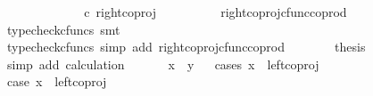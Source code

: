 \begin{isabellebody}
\ \ \ \ \isamarkupfalse%
\ \isamarkupfalse%
\ {\isachardoublequoteopen}{\isachardot}{\kern0pt}{\isachardot}{\kern0pt}{\isachardot}{\kern0pt}\ {\isacharequal}{\kern0pt}\ {\isasymlangle}{\isasymf}{\isacharcomma}{\kern0pt}\ {\isasymf}{\isasymrangle}\ {\isasymamalg}\ {\isasymlangle}{\isasymf}{\isacharcomma}{\kern0pt}{\isasymt}{\isasymrangle}\ {\isasymcirc}\isactrlsub c\ right{\isacharunderscore}{\kern0pt}coproj\ {\isasymone}\ {\isasymone}{\isachardoublequoteclose}\isanewline
\ \ \ \ \ \ \isamarkupfalse%
\ right{\isacharunderscore}{\kern0pt}coproj{\isacharunderscore}{\kern0pt}cfunc{\isacharunderscore}{\kern0pt}coprod\ \isamarkupfalse%
\ {\isacharparenleft}{\kern0pt}typecheck{\isacharunderscore}{\kern0pt}cfuncs{\isacharcomma}{\kern0pt}\ smt{\isacharparenright}{\kern0pt}\isanewline
\ \ \ \ \isamarkupfalse%
\ \isamarkupfalse%
\ {\isachardoublequoteopen}{\isachardot}{\kern0pt}{\isachardot}{\kern0pt}{\isachardot}{\kern0pt}\ {\isacharequal}{\kern0pt}\ {\isasymlangle}{\isasymf}{\isacharcomma}{\kern0pt}{\isasymt}{\isasymrangle}{\isachardoublequoteclose}\isanewline
\ \ \ \ \ \ \isamarkupfalse%
\ {\isacharparenleft}{\kern0pt}typecheck{\isacharunderscore}{\kern0pt}cfuncs{\isacharcomma}{\kern0pt}\ simp\ add{\isacharcolon}{\kern0pt}\ right{\isacharunderscore}{\kern0pt}coproj{\isacharunderscore}{\kern0pt}cfunc{\isacharunderscore}{\kern0pt}coprod{\isacharparenright}{\kern0pt}\isanewline
\ \ \ \ \isamarkupfalse%
\ \isamarkupfalse%
\ {\isacharquery}{\kern0pt}thesis\isanewline
\ \ \ \ \ \ \isamarkupfalse%
\ {\isacharparenleft}{\kern0pt}simp\ add{\isacharcolon}{\kern0pt}\ calculation{\isacharparenright}{\kern0pt}\isanewline
\ \ \isamarkupfalse%
\isanewline
\ \ \isamarkupfalse%
\ {\isachardoublequoteopen}x\ {\isacharequal}{\kern0pt}\ y{\isachardoublequoteclose}\isanewline
\ \ \isamarkupfalse%
{\isacharparenleft}{\kern0pt}cases\ {\isachardoublequoteopen}x\ {\isacharequal}{\kern0pt}\ left{\isacharunderscore}{\kern0pt}coproj\ {\isasymone}\ {\isacharparenleft}{\kern0pt}{\isasymone}\ {\isasymCoprod}\ {\isasymone}{\isacharparenright}{\kern0pt}{\isachardoublequoteclose}{\isacharparenright}{\kern0pt}\isanewline
\ \ \ \ \isamarkupfalse%
\ case{}{\isacharcolon}{\kern0pt}\ {\isachardoublequoteopen}x\ {\isacharequal}{\kern0pt}\ left{\isacharunderscore}{\kern0pt}coproj\ {\isasymone}\ {\isacharparenleft}{\kern0pt}{\isasymone}\ {\isasymCoprod}\ {\isasymone}{\isacharparenright}{\kern0pt}{\isachardoublequoteclose}\isanewline

\end{isabellebody}
